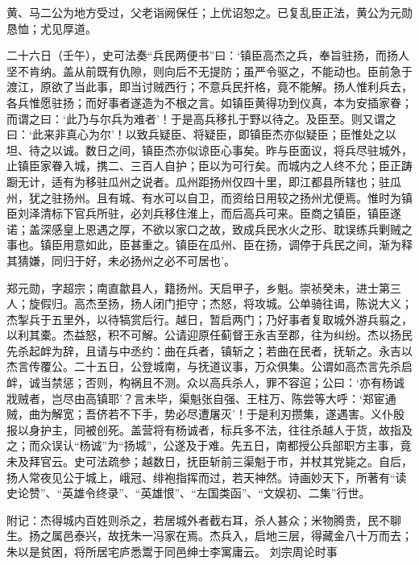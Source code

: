 \documentclass[]{article}
\begin{document}
黄、马二公为地方受过，父老诣阙保任；上优诏恕之。已复乱臣正法，黄公为元勋恳恤；尤见厚道。

二十六日（壬午），史可法奏``兵民两便书''曰：`镇臣高杰之兵，奉旨驻扬，而扬人坚不肯纳。盖从前既有仇隙，则向后不无提防；虽严令驱之，不能动也。臣前急于渡江，原欲了当此事，即当讨贼西行；不意兵民扞格，竟不能解。扬人惟利兵去，各兵惟愿驻扬；而好事者遂造为不根之言。如镇臣黄得功到仪真，本为安插家眷；而谓之曰：`此乃与尔兵为难者'！于是高兵移扎于野以待之。及臣至。则又谓之曰：`此来非真心为尔'！以致兵疑臣、将疑臣，即镇臣杰亦似疑臣；臣惟处之以坦、待之以诚。数日之间，镇臣杰亦似谅臣心事矣。昨与臣面议，将兵尽驻城外，止镇臣家眷入城，携二、三百人自护；臣以为可行矣。而城内之人终不允；臣正踌蹰无计，适有为移驻瓜州之说者。瓜州距扬州仅四十里，即江都县所辖也；驻瓜州，犹之驻扬州。且有城、有水可以自卫，而资给日用较之扬州尤便焉。惟时为镇臣刘泽清标下官兵所驻，必刘兵移住淮上，而后高兵可来。臣商之镇臣，镇臣遂诺；盖深感皇上恩遇之厚，不欲以家口之故，致成兵民水火之形、耽误练兵剿贼之事也。镇臣用意如此，臣甚重之。镇臣在瓜州、臣在扬，调停于兵民之间，渐为释其猜嫌，同归于好，未必扬州之必不可居也'。

郑元勋，字超宗；南直歙县人，籍扬州。天启甲子，乡魁。崇祯癸未，进士第三人；旋假归。高杰至扬，扬人闭门拒守；杰怒，将攻城。公单骑往谒，陈说大义；杰掣兵于五里外，以待犒赏后行。越日，暂启两门；乃好事者复取城外游兵翦之，以利其橐。杰益怒，积不可解。公请迎原任蓟督王永吉至郡，往为纠纷。杰以扬民先杀起衅为辞，且请与中丞约：曲在兵者，镇斩之；若曲在民者，抚斩之。永吉以杰言传覆公。二十五日，公登城南，与抚道议事，万众俱集。公谓如高杰言先杀启衅，诚当禁惩；否则，构祸且不测。众以高兵杀人，罪不容逭；公曰：`亦有杨诚戕贼者，岂尽由高镇耶'？言未毕，渠魁张自强、王柱万、陈尝等大呼：`郑宦通贼，曲为解宽；吾侪若不下手，势必尽遭屠灭'！于是利刃攒集，遂遇害。义仆殷报以身护主，同被创死。盖营将有杨诚者，标兵多不法，往往杀越人于货，故指及之；而众误认``杨诚''为``扬城''，公遂及于难。先五日，南都授公兵部职方主事，竟未及拜官云。史可法疏参；越数日，抚臣斩前三渠魁于市，并杖其党毙之。自后，扬人常夜见公于城上，峨冠、绯袍指挥而过，若天神然。诗画妙天下，所著有``读史论赞''、``英雄令终录''、``英雄恨''、``左国类函''、``文娱初、二集''行世。

附记：杰得城内百姓则杀之，若居城外者截右耳，杀人甚众；米物腾贵，民不聊生。扬之属邑泰兴，故抚朱一冯家在焉。杰兵入，启地三层，得藏金八十万而去；朱以是贫困，将所居宅庐悉鬻于同邑绅士李寓庸云。
刘宗周论时事
\end{document}
